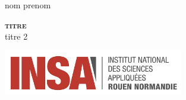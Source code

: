 \begin{titlepage} %

	
	\vspace*{\baselineskip} %
	
	
	{nom prenom} %
	
	\vspace*{0.3\textheight} %
	
	
	\textbf{\LARGE \textsc{titre}}\\[\baselineskip] %
	
	{{\Huge titre 2}}\\[\baselineskip] %
	
	\vfill %

	\vfill
	\includegraphics[height=2cm]{img/INSA.jpg}
	

\end{titlepage}
